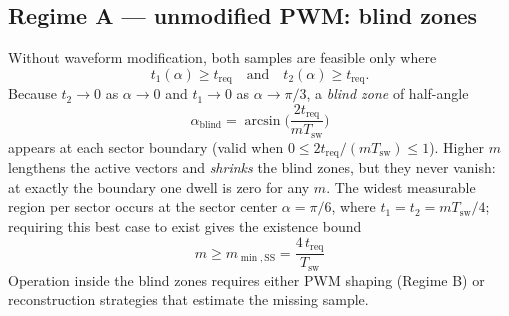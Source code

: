 \documentclass[conference]{IEEEtran}
\newcommand{\Tsw}{T_{\mathrm{sw}}}
\newcommand{\treq}{t_{\mathrm{req}}}
\newcommand{\midx}{m}
\begin{document}
\subsection{Regime A --- unmodified PWM: blind zones}
Without waveform modification, both samples are feasible only where
\begin{equation}
t_1(\alpha)\ge \treq \quad \text{and}\quad t_2(\alpha)\ge \treq .
\label{eq:two_windows}
\end{equation}
Because $t_2\!\to\!0$ as $\alpha\!\to\!0$ and $t_1\!\to\!0$ as $\alpha\!\to\!\pi/3$, a \emph{blind zone} of half-angle
\begin{equation}
\alpha_{\mathrm{blind}} = \arcsin\!\Big(\frac{2\treq}{\midx \Tsw}\Big)
\label{eq:alpha_blind}
\end{equation}
appears at each sector boundary (valid when $0 \le 2\treq/(\midx\Tsw) \le 1$). Higher $\midx$ lengthens the active vectors and \emph{shrinks} the blind zones, but they never vanish: at exactly the boundary one dwell is zero for any $\midx$. The widest measurable region per sector occurs at the sector center $\alpha=\pi/6$, where $t_1=t_2=\midx\Tsw/4$; requiring this best case to exist gives the existence bound
\begin{equation}
\ \midx \ge \midx_{\min,\mathrm{SS}} = \frac{4\,\treq}{\Tsw}\ 
\label{eq:m_min_ss}
\end{equation}
Operation inside the blind zones requires either PWM shaping (Regime B) or reconstruction strategies that estimate the missing sample.
\end{document}
